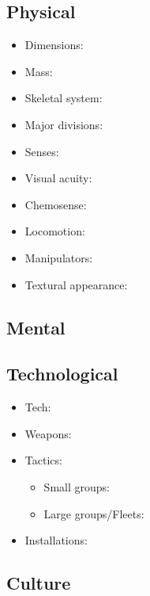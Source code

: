 \subsection{Physical}
\begin{itemize}
\item Dimensions: 

\item Mass: 

\item Skeletal system: 

\item Major divisions: 

\item Senses: 

\item Visual acuity: 

\item Chemosense: 

\item Locomotion: 

\item Manipulators: 

\item Textural appearance: 
\end{itemize}


\subsection{Mental}


\subsection{Technological}
\begin{itemize}
\item Tech: 


\item Weapons:

\item Tactics:
\begin{itemize}
\item    Small groups: 
\item    Large groups/Fleets: 
\end{itemize}


\item Installations:


\end{itemize}

\subsection{Culture}

